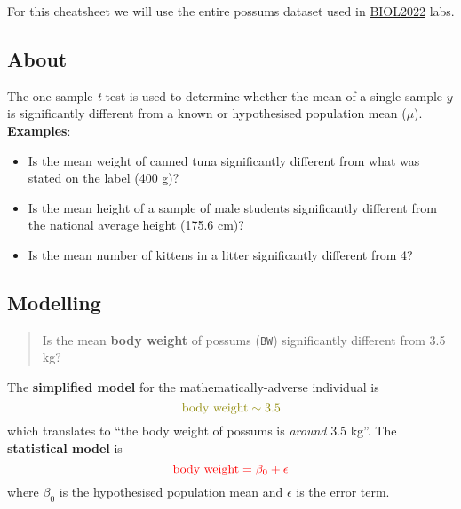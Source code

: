 \documentclass[
  letterpaper,
  DIV=11,
  numbers=noendperiod]{scrartcl}
\providecommand{\tightlist}{%
  \setlength{\itemsep}{0pt}\setlength{\parskip}{0pt}}\usepackage{longtable,booktabs,array}
\begin{document}
\begin{tcolorbox}[enhanced jigsaw, opacitybacktitle=0.6, toprule=.15mm, colbacktitle=quarto-callout-important-color!10!white, colback=white, coltitle=black, title=\textcolor{quarto-callout-important-color}{\faExclamation}\hspace{0.5em}{Data}, bottomrule=.15mm, left=2mm, breakable, bottomtitle=1mm, opacityback=0, rightrule=.15mm, titlerule=0mm, arc=.35mm, toptitle=1mm, leftrule=.75mm, colframe=quarto-callout-important-color-frame]

For this cheatsheet we will use the entire possums dataset used in
\href{https://www.sydney.edu.au/units/BIOL2022}{BIOL2022} labs.

\end{tcolorbox}

\subsection{About}\label{about}

The one-sample \emph{t}-test is used to determine whether the mean of a
single sample \(y\) is significantly different from a known or
hypothesised population mean (\(\mu\)). \textbf{Examples}:

\begin{itemize}
\tightlist
\item
  Is the mean weight of canned tuna significantly different from what
  was stated on the label (400 g)?
\item
  Is the mean height of a sample of male students significantly
  different from the national average height (175.6 cm)?
\item
  Is the mean number of kittens in a litter significantly different from
  4?
\end{itemize}

\subsection{Modelling}\label{modelling}

\begin{quote}
Is the mean \textbf{body weight} of possums (\texttt{BW}) significantly
different from 3.5 kg?
\end{quote}

The {\textbf{simplified model}} for the mathematically-adverse
individual is \[\color{olive}\text{body weight} \sim 3.5\] which
translates to ``the body weight of possums is \emph{around} 3.5 kg''.
The {\textbf{statistical model}} is
\[\color{red}\text{body weight} = \beta_0 + \epsilon\] where \(\beta_0\)
is the hypothesised population mean and \(\epsilon\) is the error term.
\end{document}
